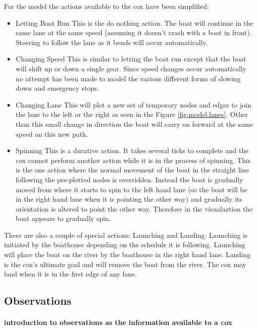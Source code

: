       For the model the actions available to the cox have been simplified:
      \begin{itemize}
        \item{Letting Boat Run} This is the do nothing action. The boat will continue in the same lane at the same speed (assuming it doesn't crash with a boat in front). Steering to follow the lane as it bends will occur automatically.
        \item{Changing Speed} This is similar to letting the boat run except that the boat will shift up or down a single gear. Since speed changes occur automatically no attempt has been made to model the various different forms of slowing down and emergency stops.
        \item{Changing Lane} This will plot a new set of temporary nodes and edges to join the lane to the left or the right as seen in the Figure \ref{fig:model:lanes}. Other than this small change in direction the boat will carry on forward at the same speed on this new path.
        \item{Spinning} This is a durative action. It takes several ticks to complete and the cox cannot perform another action while it is in the process of spinning. This is the one action where the normal movement of the boat in the straight line following the pre-plotted nodes  is overridden. Instead the boat is gradually moved from where it starts to spin to the left hand lane (so the boat will be in the right hand lane when it is pointing the other way) and gradually its orientation is altered to point the other way. Therefore in the visualaztion the boat appears to gradually spin.
      \end{itemize}
      
      There are also a couple of special actions: Launching and Landing. Launching is initiated by the boathouse depending on the schedule it is following. Launching will place the boat on the river by the boathouse in the right hand lane. Landing is the cox's ultimate goal and will remove the boat from the river. The cox may land when it is in the first edge of any lane.
      
      \subsection{Observations} \label{model:cox:obs}
      \paragraph{introduction to observations as the information available to a cox}
      
